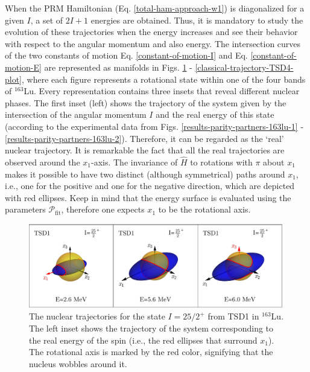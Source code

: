 When the PRM Hamiltonian (Eq. \ref{total-ham-approach-w1}) is diagonalized for a given $I$, a set of $2I+1$ energies are obtained. Thus, it is mandatory to study the evolution of these trajectories when the energy increases and see their behavior with respect to the angular momentum and also energy. The intersection curves of the two constants of motion Eq. \ref{constant-of-motion-I} and Eq. \ref{constant-of-motion-E} are represented as manifolds in Figs. \ref{classical-trajectory-TSD1-plot} - \ref{classical-trajectory-TSD4-plot}, where each figure represents a rotational state within one of the four bands of $^{163}$Lu. Every representation contains three insets that reveal different nuclear phases. The first inset (left) shows the trajectory of the system given by the intersection of the angular momentum $I$ and the real energy of this state (according to the experimental data from Figs. \ref{results-parity-partners-163lu-1} - \ref{results-parity-partners-163lu-2}). Therefore, it can be regarded as the `real' nuclear trajectory. It is remarkable the fact that all the real trajectories are observed around the $x_1$-axis. The invariance of $\hat{H}$ to rotations with $\pi$ about $x_1$ makes it possible to have two distinct (although symmetrical) paths around $x_1$, i.e., one for the positive and one for the negative direction, which are depicted with red ellipses. Keep in mind that the energy surface is evaluated using the parameters $\mathcal{P}_\text{fit}$, therefore one expects $x_1$ to be the rotational axis.
\begin{figure}
    \centering
    \includegraphics[width=0.99\textwidth]{Chapters/Figures/parity-partners-plots/classical-trajectory-TSD1.pdf}
    \caption{The nuclear trajectories for the state $I=25/2^+$ from TSD1 in $^{163}$Lu. The left inset shows the trajectory of the system corresponding to the real energy of the spin (i.e., the red ellipses that surround $x_1$). The rotational axis is marked by the red color, signifying that the nucleus wobbles around it.}
    \label{classical-trajectory-TSD1-plot}
\end{figure}
